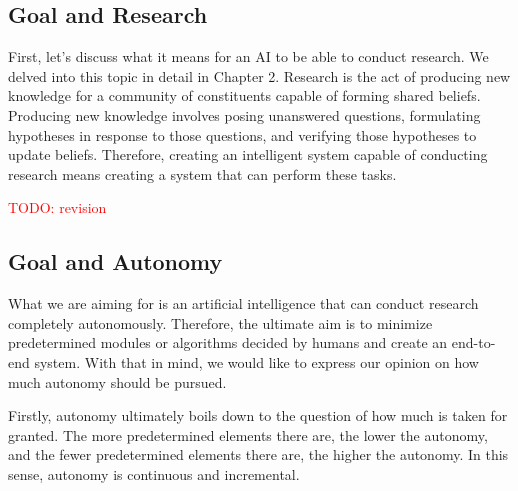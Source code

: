 \documentclass{book}
\begin{document}
\subsection{Goal and Research}
First, let's discuss what it means for an AI to be able to conduct research. We delved into this topic in detail in Chapter 2. Research is the act of producing new knowledge for a community of constituents capable of forming shared beliefs. Producing new knowledge involves posing unanswered questions, formulating hypotheses in response to those questions, and verifying those hypotheses to update beliefs. Therefore, creating an intelligent system capable of conducting research means creating a system that can perform these tasks.

\textcolor{red}{TODO: revision}

\subsection{Goal and Autonomy}

What we are aiming for is an artificial intelligence that can conduct research completely autonomously. Therefore, the ultimate aim is to minimize predetermined modules or algorithms decided by humans and create an end-to-end system. With that in mind, we would like to express our opinion on how much autonomy should be pursued.

Firstly, autonomy ultimately boils down to the question of how much is taken for granted. The more predetermined elements there are, the lower the autonomy, and the fewer predetermined elements there are, the higher the autonomy. In this sense, autonomy is continuous and incremental.
\end{document}
